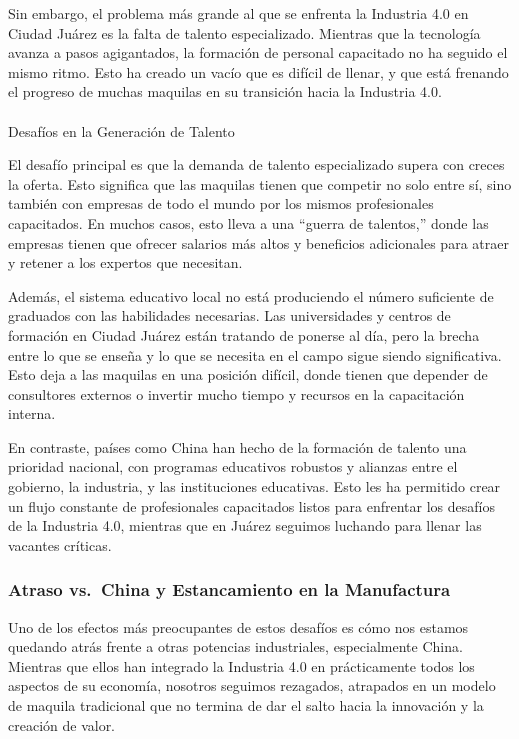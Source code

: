 \documentclass[
  letterpaper,
]{book}
\makeatletter
\let\oldparagraph\paragraph
\renewcommand{\paragraph}{
    \@ifstar
      \xxxParagraphStar
      \xxxParagraphNoStar
  }
\newcommand{\xxxParagraphStar}[1]{\oldparagraph*{#1}\mbox{}}
\newcommand{\xxxParagraphNoStar}[1]{\oldparagraph{#1}\mbox{}}
\makeatother
\begin{document}
Sin embargo, el problema más grande al que se enfrenta la Industria 4.0
en Ciudad Juárez es la falta de talento especializado. Mientras que la
tecnología avanza a pasos agigantados, la formación de personal
capacitado no ha seguido el mismo ritmo. Esto ha creado un vacío que es
difícil de llenar, y que está frenando el progreso de muchas maquilas en
su transición hacia la Industria 4.0.

\paragraph{Desafíos en la Generación de
Talento}\label{desafuxedos-en-la-generaciuxf3n-de-talento}

El desafío principal es que la demanda de talento especializado supera
con creces la oferta. Esto significa que las maquilas tienen que
competir no solo entre sí, sino también con empresas de todo el mundo
por los mismos profesionales capacitados. En muchos casos, esto lleva a
una ``guerra de talentos,'' donde las empresas tienen que ofrecer
salarios más altos y beneficios adicionales para atraer y retener a los
expertos que necesitan.

Además, el sistema educativo local no está produciendo el número
suficiente de graduados con las habilidades necesarias. Las
universidades y centros de formación en Ciudad Juárez están tratando de
ponerse al día, pero la brecha entre lo que se enseña y lo que se
necesita en el campo sigue siendo significativa. Esto deja a las
maquilas en una posición difícil, donde tienen que depender de
consultores externos o invertir mucho tiempo y recursos en la
capacitación interna.

En contraste, países como China han hecho de la formación de talento una
prioridad nacional, con programas educativos robustos y alianzas entre
el gobierno, la industria, y las instituciones educativas. Esto les ha
permitido crear un flujo constante de profesionales capacitados listos
para enfrentar los desafíos de la Industria 4.0, mientras que en Juárez
seguimos luchando para llenar las vacantes críticas.

\subsubsection{Atraso vs.~China y Estancamiento en la
Manufactura}\label{atraso-vs.-china-y-estancamiento-en-la-manufactura}

Uno de los efectos más preocupantes de estos desafíos es cómo nos
estamos quedando atrás frente a otras potencias industriales,
especialmente China. Mientras que ellos han integrado la Industria 4.0
en prácticamente todos los aspectos de su economía, nosotros seguimos
rezagados, atrapados en un modelo de maquila tradicional que no termina
de dar el salto hacia la innovación y la creación de valor.
\end{document}
